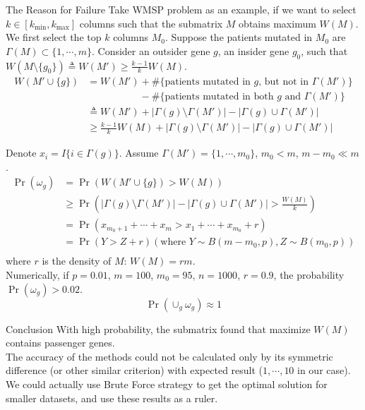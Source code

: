 \documentclass[xcolor=dvipsnames]{beamer}
\begin{document}
\begin{frame}{The Reason for Failure}
Take WMSP problem as an example, if we want to select $k\in[k_{\min},k_{\max}]$ columns such that the submatrix $M$ obtains maximum $W(M)$.\\
We first select the top $k$ columns $M_0$. Suppose the patients mutated in $M_0$ are $\Gamma(M)\subset \{1,\cdots,m\}$. Consider an outsider gene $g$, an insider gene $g_0$, such that $W(M\setminus \{g_0\})\triangleq W(M')\geqslant \frac{k-1}{k}W(M)$.\\
\begin{displaymath}
\begin{split}
W(M'\cup \{g\})&=W(M')+\#\{\text{patients mutated in }g\text{, but not in }\Gamma(M')\}\\
&\phantom{=W(M)'}-\#\{\text{patients mutated in both }g\text{ and }\Gamma(M')\}\\
&\triangleq W(M')+|\Gamma(g)\setminus\Gamma(M')|-|\Gamma(g)\cup\Gamma(M')|\\
&\geqslant \frac{k-1}{k}W(M)+|\Gamma(g)\setminus\Gamma(M')|-|\Gamma(g)\cup\Gamma(M')|
\end{split}
\end{displaymath}
\end{frame}
\begin{frame}
Denote $x_i=I\{i\in\Gamma(g)\}$. Assume $\Gamma(M')=\{1,\cdots,m_0\}$, $m_0<m$, $m-m_0\ll m$.\\
\begin{displaymath}
\begin{split}
\Pr(\omega_g)&= \Pr(W(M'\cup\{g\})>W(M))\\
&\geqslant\Pr(|\Gamma(g)\setminus\Gamma(M')|-|\Gamma(g)\cup\Gamma(M')|>\frac{W(M)}{k})\\
&=\Pr(x_{m_0+1}+\cdots+x_{m}>x_1+\cdots+x_{m_0}+r)\\
&=\Pr(Y>Z+r) (\text{where }Y\sim B(m-m_0,p), Z\sim B(m_0,p))\\
\end{split}
\end{displaymath}
where $r$ is the density of $M$: $W(M)=rm$.\\
Numerically, if $p=0.01$, $m=100$, $m_0=95$, $n=1000$, $r=0.9$, the probability $\Pr(\omega_g)>0.02$.\\
\[\Pr(\cup_g\omega_g)\approx 1\]
\end{frame}
\begin{frame}{Conclusion}
With high probability, the submatrix found that maximize $W(M)$ contains passenger genes.\\
The accuracy of the methods could not be calculated only by its symmetric difference (or other similar criterion) with expected result ($1,\cdots,10$ in our case).\\
We could actually use Brute Force strategy to get the optimal solution for smaller datasets, and use these results as a ruler.\\
\end{frame}
\end{document}
